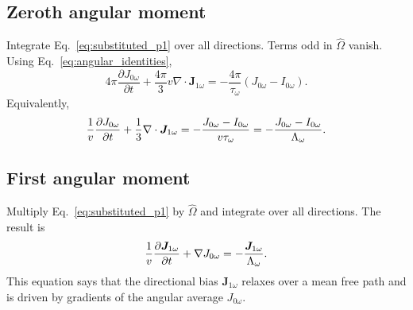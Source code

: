 \documentclass[11pt]{article}
\begin{document}
\subsection{Zeroth angular moment}
Integrate Eq.~\eqref{eq:substituted_p1} over all directions. Terms odd in \(\hat{\Omega}\) vanish. Using Eq.~\eqref{eq:angular_identities},
\begin{equation}
    4\pi\frac{\partial J_{0\omega}}{\partial t}
    +\frac{4\pi}{3}v\nabla\cdot\bm{J}_{1\omega}
    =-\frac{4\pi}{\tau_\omega}(J_{0\omega}-I_{0\omega}).
    \label{eq:zeroth_moment_dimensional}
\end{equation}
Equivalently,
\begin{equation}
    \frac{1}{v}\frac{\partial J_{0\omega}}{\partial t}
    +\frac{1}{3}\nabla\cdot\bm{J}_{1\omega}
    =-\frac{J_{0\omega}-I_{0\omega}}{v\tau_\omega}
    =-\frac{J_{0\omega}-I_{0\omega}}{\Lambda_\omega}.
\end{equation}

\subsection{First angular moment}
Multiply Eq.~\eqref{eq:substituted_p1} by \(\hat{\Omega}\) and integrate over all directions. The result is
\begin{equation}
    \frac{1}{v}\frac{\partial \bm{J}_{1\omega}}{\partial t}+\nabla J_{0\omega}
    =-\frac{\bm{J}_{1\omega}}{\Lambda_\omega}.
    \label{eq:first_moment_p1}
\end{equation}
This equation says that the directional bias \(\bm{J}_{1\omega}\) relaxes over a mean free path and is driven by gradients of the angular average \(J_{0\omega}\).
\end{document}
